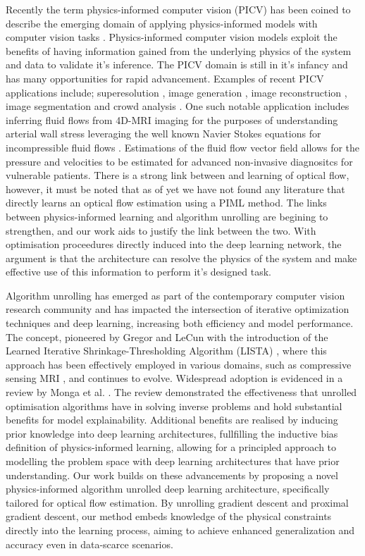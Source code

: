 \IEEEPARstart{}{} Recently the term physics-informed computer vision (PICV) has been coined to describe the emerging domain of applying physics-informed models with computer vision tasks \cite{banerjee2023physics}. Physics-informed computer vision models exploit the benefits of having information gained from the underlying physics of the system and data to validate it's inference. The PICV domain is still in it's infancy and has many opportunities for rapid advancement. Examples of recent PICV applications include; superesolution \cite{arora2022spatio}, image generation \cite{zheng2020physics}, image reconstruction \cite{chu2022physics}, image segmentation \cite{jenkins2020physics, cciccek20163d} and crowd analysis \cite{behera2021pidlnet}. One such notable application includes inferring fluid flows from 4D-MRI imaging for the purposes of understanding arterial wall stress leveraging the well known Navier Stokes equations for incompressible fluid flows \cite{raissi2020hidden}. Estimations of the fluid flow vector field allows for the pressure and velocities to be estimated for advanced non-invasive diagnositcs for vulnerable patients. There is a strong link between \cite{raissi2020hidden} and learning of optical flow, however, it must be noted that as of yet we have not found any literature that directly learns an optical flow estimation using a PIML method. The links between physics-informed learning and algorithm unrolling are begining to strengthen, and our work aids to justify the link between the two. With optimisation proceedures directly induced into the deep learning network, the argument is that the architecture can resolve the physics of the system and make effective use of this information to perform it's designed task.

\IEEEPARstart{}{} Algorithm unrolling has emerged as part of the contemporary computer vision research community and has impacted the intersection of iterative optimization techniques and deep learning, increasing both efficiency and model performance. The concept, pioneered by Gregor and LeCun with the introduction of the Learned Iterative Shrinkage-Thresholding Algorithm (LISTA) \cite{gregor2010learning}, where this approach has been effectively employed in various domains, such as compressive sensing MRI \cite{yang2016deep}, and continues to evolve. Widespread adoption is evidenced in a review by Monga et al. \cite{monga2021algorithm}. The review demonstrated the effectiveness that unrolled optimisation algorithms have in solving inverse problems and hold substantial benefits for model explainability. Additional benefits are realised by inducing prior knowledge into deep learning architectures, fullfilling the inductive bias definition of physics-informed learning, allowing for a principled approach to modelling the problem space with deep learning architectures that have prior understanding. Our work builds on these advancements by proposing a novel physics-informed algorithm unrolled deep learning architecture, specifically tailored for optical flow estimation. By unrolling gradient descent and proximal gradient descent, our method embeds knowledge of the physical constraints directly into the learning process, aiming to achieve enhanced generalization and accuracy even in data-scarce scenarios.

